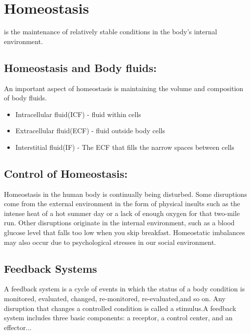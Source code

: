 \documentclass[12pts]{article}
\begin{document}
\section*{Homeostasis}
\begin{flushleft}
is the maintenance of relatively stable conditions in the body’s internal environment.
\subsection*{Homeostasis and Body fluids:}
An important aspect of homeostasis is maintaining the volume and composition of body fluids.
\begin{itemize}
\item Intracellular fluid(ICF) - fluid within cells
\item Extracellular fluid(ECF) - fluid outside body cells
\item Interstitial fluid(IF) - The ECF that fills the narrow  spaces between cells
\end{itemize}

\subsection*{Control of Homeostasis:}
Homeostasis in the human body is continually being disturbed. Some 
disruptions come from the external environment in the form of physical insults such as the intense heat of a hot summer day or a lack of 
enough oxygen for that two-mile run. Other disruptions originate in 
the internal environment, such as a blood glucose level that falls too 
low when you skip breakfast. Homeostatic imbalances may also occur 
due to psychological stresses in our social environment.

\subsection*{Feedback Systems}
A feedback system  is a cycle of events in which the status of a body condition is monitored, evaluated, changed, re-monitored, re-evaluated,and so on.
Any disruption that changes a controlled 
condition is called a stimulus.A feedback system includes three basic 
components: a receptor, a control center, and an effector...


\end{flushleft}
\end{document}
